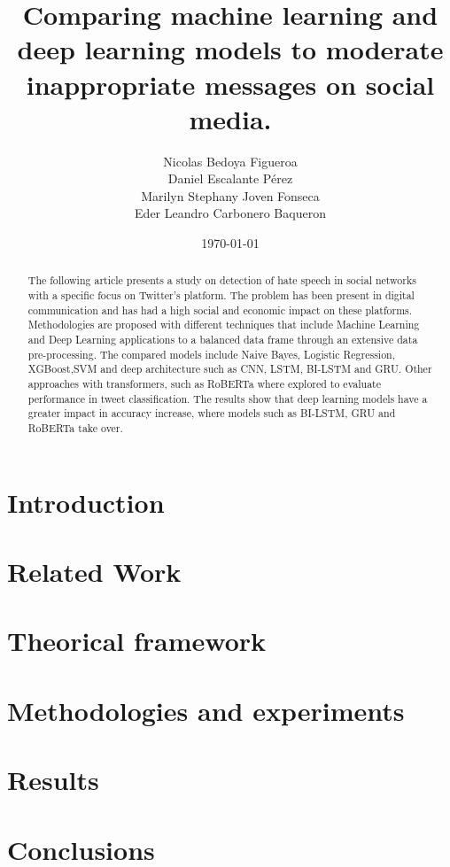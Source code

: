 \documentclass[conference]{IEEEtran}
\title{Comparing machine learning and deep learning models to moderate inappropriate messages on social media.}
\author{Nicolas Bedoya Figueroa \\
Daniel Escalante Pérez \\
Marilyn Stephany Joven Fonseca \\
Eder Leandro Carbonero Baqueron \\}
\date{\today}
\begin{document}
\maketitle
\begin{abstract}
The following article presents a study on detection of hate speech in social networks with a specific focus on Twitter's platform. The problem has been present in digital communication and has had a high social and economic impact on these platforms. Methodologies are proposed with different techniques that include Machine Learning and Deep Learning applications to a balanced data frame through an extensive data pre-processing. The compared models include Naive Bayes, Logistic Regression, XGBoost,SVM and deep architecture such as CNN, LSTM, BI-LSTM and GRU. Other approaches with transformers, such as RoBERTa where explored to evaluate performance in tweet classification. The results show that deep learning models have a greater impact in accuracy increase, where models such as BI-LSTM, GRU and RoBERTa take over.
\end{abstract}

\section{Introduction}


\section{Related Work}


\section{Theorical framework}


\section{Methodologies and experiments}
\label{sec:methodologies}


\section{Results}


\section{Conclusions}




\end{document}
